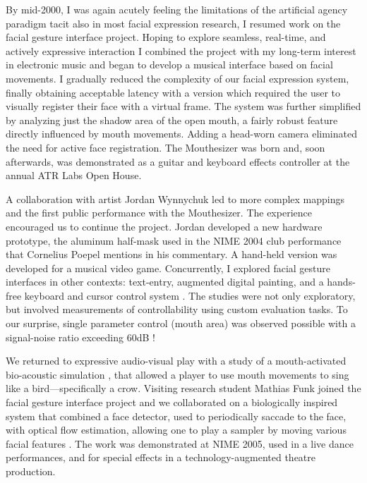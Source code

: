 By mid-2000, I was again acutely feeling the limitations of the artificial agency paradigm tacit also in most facial expression research, I resumed work on the facial gesture interface project. Hoping to explore seamless, real-time, and actively expressive interaction I combined the project with my long-term interest in electronic music and began to develop a musical interface based on facial movements. I gradually reduced the complexity of our facial expression system, finally obtaining acceptable latency with a version which required the user to visually register their face with a virtual frame. The system was further simplified by analyzing just the shadow area of the open mouth, a fairly robust feature directly influenced by mouth movements. Adding a head-worn camera eliminated the need for active face registration. The Mouthesizer was born and, soon afterwards, was demonstrated as a guitar and keyboard effects controller at the annual ATR Labs Open House. 

A collaboration with artist Jordan Wynnychuk led to more complex mappings and the first public performance with the Mouthesizer. The experience encouraged us to continue the project. Jordan developed a new hardware prototype, the aluminum half-mask used in the NIME 2004 club performance  that Cornelius Poepel mentions in his commentary. A hand-held version was developed for a musical video game. Concurrently, I explored facial gesture interfaces in other contexts: text-entry, augmented digital painting, and a hands-free keyboard and cursor control system \cite{Chan:2008,Lyons:2004,Morikawa:2013}. The studies were not only exploratory, but involved measurements of controllability using custom evaluation tasks. To our surprise, single parameter control (mouth area) was observed possible with a signal-noise ratio exceeding 60dB \cite{Chan:2008,Morikawa:2013}!

We returned to expressive audio-visual play with a study of a mouth-activated bio-acoustic simulation \cite{Silva:2004}, that allowed a player to use mouth movements to sing like a bird---specifically a crow. Visiting research student Mathias Funk joined the facial gesture interface project and we collaborated on a biologically inspired system that combined a face detector, used to periodically saccade to the face, with optical flow estimation, allowing one to play a sampler by moving various facial features \cite{Funk:2005}. The work was demonstrated at NIME 2005, used in a live dance performances, and for special effects in a technology-augmented theatre production.

